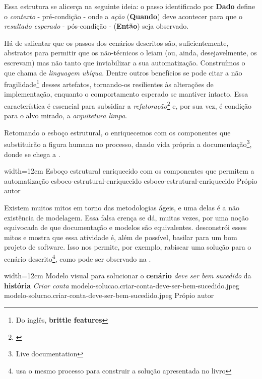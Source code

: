   Essa estrutura se alicerça na seguinte ideia: o passo identificado por \textbf{Dado} define o \emph{contexto} - pré-condição - onde a \emph{ação} (\textbf{Quando}) deve acontecer para que o \emph{resultado esperado} - pós-condição - (\textbf{Então}) seja observado.

  Há de salientar que os passos dos cenários descritos são, suficientemente, abstratos para permitir que os não-técnicos o leiam (ou, ainda, desejavelmente, os escrevam) mas não tanto que inviabilizar a sua automatização. Construímos o que  chama de \emph{linguagem ubíqua}. Dentre outros benefícios se pode citar a não fragilidade\footnote{\cite[pág. 93]{RoseWynneHellesoy2015} Do inglês, \textbf{brittle features}} desses artefatos, tornando-os resilientes às alterações de implementação, enquanto o comportamento esperado se mantiver intacto. Essa característica é essencial para subsidiar a \emph{refatoração}\footnote{\cite{Fowler1999}} e, por sua vez, é condição para o alvo mirado, a \emph{arquitetura limpa}.

  Retomando o esboço estrutural, o enriquecemos com os componentes que substituirão a figura humana no processo, dando vida própria a documentação\footnote{ Live documentation}, donde se chega a .

  \imagem
    {width=12cm}
    {Esboço estrutural enriquecido com os componentes que permitem a automatização}
    {esboco-estrutural-enriquecido}
    {esboco-estrutural-enriquecido}
    {Própio autor}

  Existem muitos mitos em torno das metodologias ágeis, e uma delas é a não existência de modelagem. Essa falsa crença se dá, muitas vezes, por uma noção equivocada de que documentação e modelos são equivalentes.  desconstrói esses mitos e mostra que essa atividade é, além de possível, basilar para um bom projeto de software. Isso nos permite, por exemplo, rabiscar uma solução para o cenário descrito\footnote{ usa o mesmo processo para construir a solução apresentada no livro}, como pode ser observado na .

  \imagem
    {width=12cm}
    {Modelo visual para solucionar o \textbf{cenário} \emph{deve ser bem sucedido} da \textbf{história} \emph{Criar conta}}
    {modelo-solucao.criar-conta-deve-ser-bem-sucedido.jpeg}
    {modelo-solucao.criar-conta-deve-ser-bem-sucedido.jpeg}
    {Própio autor}

